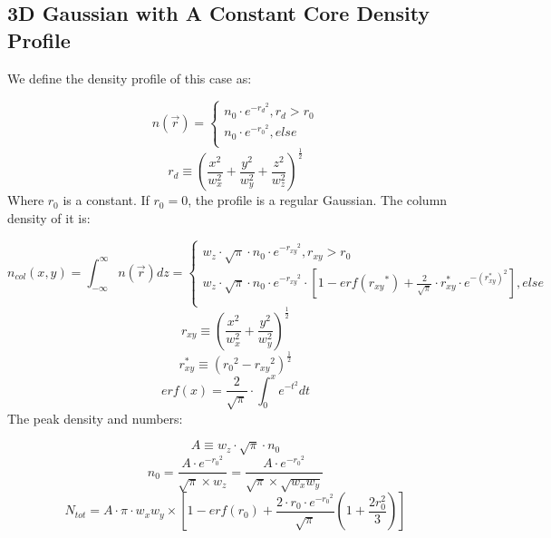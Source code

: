 \documentclass[a4paper]{article}
\begin{document}
\begin{spacing}{1.25}
\newpage
\section{3D Gaussian with A Constant Core Density Profile}
We define the density profile of this case as:

\begin{equation}
n(\vec{r}) = 
\begin{cases}
n_{0} \cdot e^{-{r_{d}}^2},  r_{d} > r_{0} \\
n_{0} \cdot e^{-{r_{0}}^2},  else\\
\end{cases}
\end{equation}
\begin{equation}
r_{d} \equiv (\dfrac{x^{2}}{w_{x}^{2}}+\dfrac{y^{2}}{w_{y}^{2}}+\dfrac{z^{2}}{w_{z}^{2}})^{\frac{1}{2}}
\end{equation}
Where $r_{0}$ is a constant. If $r_{0} =0$, the profile is a regular Gaussian.
The column density of it is:

\begin{equation}
n_{col}(x,y) = \int_{-\infty}^\infty n(\vec{r}) dz=
\begin{cases}
 w_{z}\cdot\sqrt{\pi}\cdot n_{0}\cdot e^{-{r_{xy}}^2},  r_{xy}>r_{0}\\
  w_{z}\cdot\sqrt{\pi}\cdot n_{0}\cdot e^{-{r_{xy}}^2}\cdot[1-erf({r_{xy}}^*)+\frac{2}{\sqrt{\pi}}\cdot  r_{xy}^* \cdot e^{-(r_{xy}^*)^2}],  else\\
 \end{cases}
\end{equation}
\begin{equation}
r_{xy} \equiv (\dfrac{x^{2}}{w_{x}^{2}}+\dfrac{y^{2}}{w_{y}^{2}})^{\frac{1}{2}}
\end{equation}
\begin{equation}
r_{xy}^* \equiv ({r_0}^2-{r_{xy}}^2)^{\frac{1}{2}}
\end{equation}
\begin{equation}
erf(x) = \frac{2}{\sqrt{\pi}}\cdot \int_0^x e^{-t^2} dt
\end{equation}
The peak density and numbers:

\begin{equation}
A \equiv w_{z}\cdot\sqrt{\pi}\cdot n_{0}
\end{equation}
\begin{equation}
n_{0} = \frac{A\cdot e^{-{r_{0}}^2}}{\sqrt{\pi}\times w_{z}} = \frac{A\cdot e^{-{r_{0}}^2}}{\sqrt{\pi}\times \sqrt{w_{x}w_{y}}}
\end{equation}
\begin{equation}
N_{tot} = A\cdot \pi \cdot w_{x}w_{y} \times
[1-erf(r_{0})+
\frac{2\cdot r_{0}\cdot e^{-{r_{0}}^2}}{\sqrt{\pi}}(1+
\frac{2 r_{0}^{2} }{3})]
\end{equation}
\end{spacing}
\end{document}
